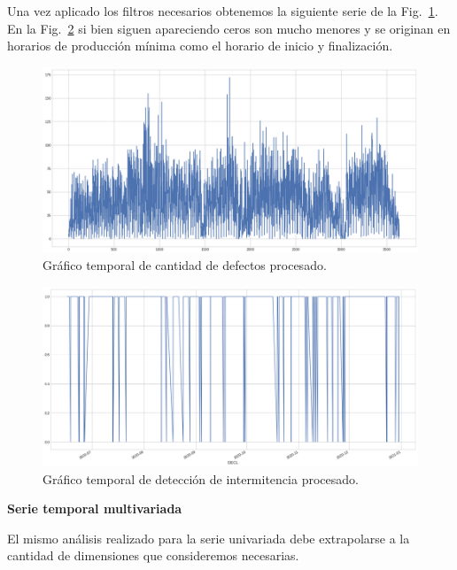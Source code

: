 \documentclass[a4paper,12pt]{article}
\begin{document}
Una vez aplicado los filtros necesarios obtenemos la siguiente serie de la Fig.~\ref{fig:graf_cantdef_desp}. En la Fig.~\ref{fig:graf_inter_desp} si bien siguen apareciendo ceros son mucho menores y se originan en horarios de producción mínima como el horario de inicio y finalización.

\begin{figure}[H]
	\begin{center}
	\includegraphics[width=1\textwidth]{tesis_80.png}
  	\caption{Gráfico temporal de cantidad de defectos procesado.}
  	\label{fig:graf_cantdef_desp}
  	\end{center}
\end{figure}

\begin{figure}[H]
	\begin{center}
	\includegraphics[width=1\textwidth]{tesis_81.png}
  	\caption{Gráfico temporal de detección de intermitencia  procesado.}
  	\label{fig:graf_inter_desp}
  	\end{center}
\end{figure}

\textbf{Serie temporal multivariada}

El mismo análisis realizado para la serie univariada debe extrapolarse a la cantidad de dimensiones que consideremos necesarias. 
\end{document}
